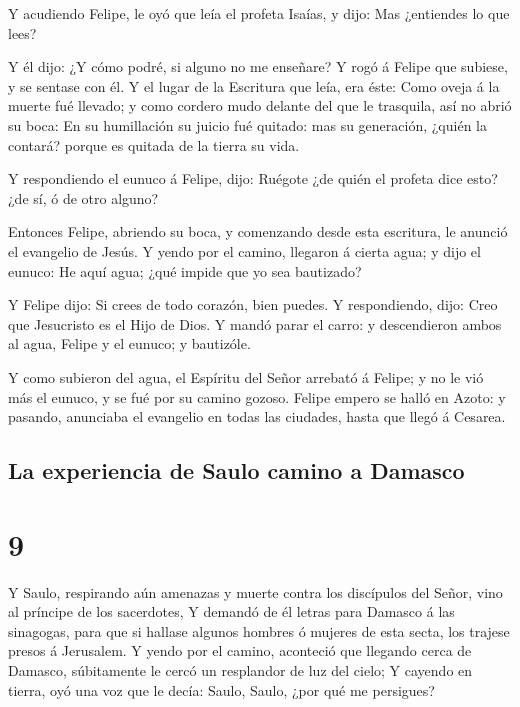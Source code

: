  Y acudiendo Felipe, le oyó que leía el profeta Isaías, y
dijo: Mas ¿entiendes lo que lees?

 Y él dijo: ¿Y cómo podré, si alguno no me enseñare? Y
rogó á Felipe que subiese, y se sentase con él.  Y el
lugar de la Escritura que leía, era éste: Como oveja á la muerte fué
llevado; y como cordero mudo delante del que le trasquila, así no abrió
su boca:  En su humillación su juicio fué quitado: mas su
generación, ¿quién la contará? porque es quitada de la tierra su vida.

 Y respondiendo el eunuco á Felipe, dijo: Ruégote ¿de
quién el profeta dice esto? ¿de sí, ó de otro alguno?

 Entonces Felipe, abriendo su boca, y comenzando desde
esta escritura, le anunció el evangelio de Jesús.  Y
yendo por el camino, llegaron á cierta agua; y dijo el eunuco: He aquí
agua; ¿qué impide que yo sea bautizado?

 Y Felipe dijo: Si crees de todo corazón, bien puedes. Y
respondiendo, dijo: Creo que Jesucristo es el Hijo de Dios.
 Y mandó parar el carro: y descendieron ambos al agua,
Felipe y el eunuco; y bautizóle.

 Y como subieron del agua, el Espíritu del Señor arrebató
á Felipe; y no le vió más el eunuco, y se fué por su camino gozoso.
 Felipe empero se halló en Azoto: y pasando, anunciaba el
evangelio en todas las ciudades, hasta que llegó á Cesarea.

\hypertarget{la-experiencia-de-saulo-camino-a-damasco}{%
\subsection{La experiencia de Saulo camino a
Damasco}\label{la-experiencia-de-saulo-camino-a-damasco}}

\hypertarget{section-44-9}{%
\section{9}\label{section-44-9}}

 Y Saulo, respirando aún amenazas y muerte contra los
discípulos del Señor, vino al príncipe de los sacerdotes, 
Y demandó de él letras para Damasco á las sinagogas, para que si hallase
algunos hombres ó mujeres de esta secta, los trajese presos á Jerusalem.
 Y yendo por el camino, aconteció que llegando cerca de
Damasco, súbitamente le cercó un resplandor de luz del cielo;
 Y cayendo en tierra, oyó una voz que le decía: Saulo,
Saulo, ¿por qué me persigues?

